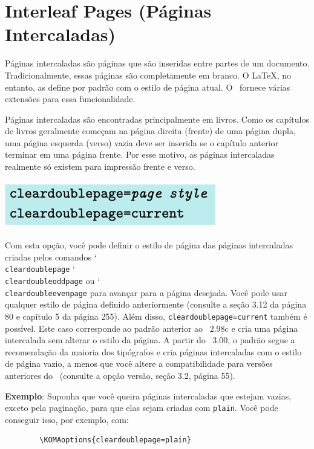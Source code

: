 \chapter[Interleaf Pages]{Interleaf Pages (Páginas Intercaladas)}

Páginas intercaladas são páginas que são inseridas entre partes de um documento. Tradicionalmente, essas páginas são completamente em branco. O \LaTeX, no entanto, as define por padrão com o estilo de página atual. O \KOMAScript\ fornece várias extensões para essa funcionalidade.

Páginas intercaladas são encontradas principalmente em livros. Como os capítulos de livros geralmente começam na página direita (frente) de uma página dupla, uma página esquerda (verso) vazia deve ser inserida se o capítulo anterior terminar em uma página frente. Por esse motivo, as páginas intercaladas realmente só existem para impressão frente e verso.
\begin{center}
    \includegraphics[width=0.5\linewidth]{imagem15.png}
\end{center}
Com esta opção, você pode definir o estilo de página das páginas intercaladas criadas pelos comandos \char`\\\texttt{clear\-dou\-ble\-pa\-ge} \char`\\\texttt{clear\-dou\-ble\-odd\-pa\-ge}  ou \char`\\\texttt{clear\-dou\-ble\-e\-ven\-pa\-ge} para avançar para a página desejada. Você pode usar qualquer estilo de página definido anteriormente (consulte a seção 3.12 da página 80 e capítulo 5 da página 255). Além disso, \texttt{clear\-dou\-ble\-pa\-ge=cur\-rent} também é possível. Este caso corresponde ao padrão anterior ao \KOMAScript~2.98c e cria uma página intercalada sem alterar o estilo da página. A partir do \KOMAScript~3.00, o padrão segue a recomendação da maioria dos tipógrafos e cria páginas intercaladas com o estilo de página vazio, a menos que você altere a compatibilidade para versões anteriores do \KOMAScript\ (consulte a opção versão, seção 3.2, página 55).

\textbf{Exemplo}: Suponha que você queira páginas intercaladas que estejam vazias, exceto pela paginação, para que elas sejam criadas com \texttt{plain}. Você pode conseguir isso, por exemplo, com:

\begin{verbatim}
        \KOMAoptions{cleardoublepage=plain}
\end{verbatim}

